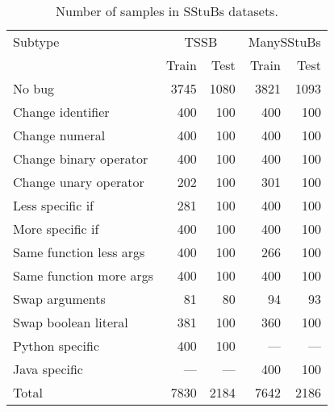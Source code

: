 \begin{table}[h]
    \centering
    \caption{Number of samples in SStuBs datasets.}
    \label{tab:sstubs-datasets}
    \begin{tabular}{lrrrr}
    \toprule
         Subtype & \multicolumn{2}{c}{TSSB} & \multicolumn{2}{c}{ManySStuBs}\\
         \cmidrule(lr){2-3}\cmidrule(lr){4-5}
         & Train & Test & Train & Test\\
         \midrule

No bug & 3745 & 1080 & 3821 & 1093\\
Change identifier & 400 & 100 & 400 & 100\\
Change numeral & 400 & 100 & 400 & 100\\
Change binary operator & 400 & 100 & 400 & 100\\
Change unary operator & 202 & 100 & 301 & 100\\
Less specific if & 281 & 100 & 400 & 100\\
More specific if & 400 & 100 & 400 & 100\\
Same function less args & 400 & 100 & 266 & 100\\
Same function more args & 400 & 100 & 400 & 100\\
Swap arguments & 81 & 80 & 94 & 93\\
Swap boolean literal & 381 & 100 & 360 & 100\\
Python specific & 400 & 100 & --- & ---\\
Java specific & --- & --- & 400 & 100\\
\midrule
Total & 7830 & 2184 & 7642 & 2186\\
    \bottomrule
    \end{tabular}
\end{table}

